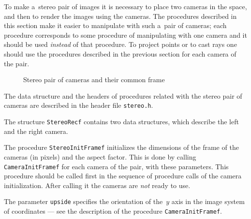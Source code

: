 To make a~stereo pair of images it is necessary to place two cameras
in the space, and then to render the images using the cameras.
The procedures described in this section make it easier to manipulate with
such a~pair of cameras; each procedure corresponds to some procedure of   
manipulating with one camera and it should be used \emph{instead} of that 
procedure. To project points or to cast rays one should use the procedures
described in the previous section for each camera of the pair.
\begin{figure}[ht]
  \centerline{}
  \caption{Stereo pair of cameras and their common frame}
\end{figure}%

The data structure and the headers of procedures related with the
stereo pair of cameras are described in the header file \texttt{stereo.h}.

\vspace{\bigskipamount}
The structure \texttt{StereoRecf} contains two data structures, which
describe
the left and the right camera.

\vspace{\bigskipamount}
\begin{sloppypar}
The procedure \texttt{StereoInitFramef} initializes the dimensions of the frame
of the cameras (in pixels) and the aspect factor. This is done by calling 
\texttt{CameraInitFramef} for each camera of the pair, with these
parameters.
This procedure should be called first in the sequence of procedure calls
of the camera initialization. After calling it the cameras are \emph{not}
ready to use.%
\end{sloppypar}

The parameter \texttt{upside} specifies the orientation of the~$y$ axis in
the image system of coordinates --- see the description of
the procedure \texttt{CameraInitFramef}.

